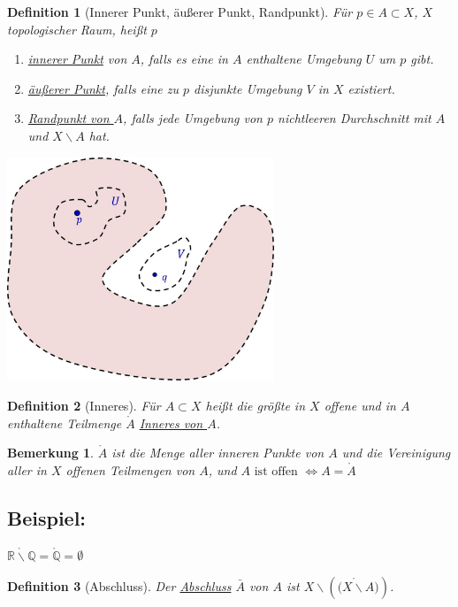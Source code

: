 \documentclass[a4paper,11pt,notitlepage]{report}
\newtheorem{definition}{Definition}[chapter]
\newtheorem{remark}{Bemerkung}[chapter]
\newcommand{\R}{{\ensuremath{\mathbb{R}}}}
\newcommand{\Q}{{\ensuremath{\mathbb{Q}}}}
\newenvironment{bsp}[1]
{
\setlength{\fboxsep}{10pt}
\subsection*{Beispiel: #1}
\begin{upshape}
}
{
\end{upshape}
}
\begin{document}
\begin{definition}[Innerer Punkt, äußerer Punkt, Randpunkt]
	Für $p \in A \subset X$, $X$ topologischer Raum, heißt $p$
	\newline
	\begin{enumerate}[(1)]
		\item \underline{innerer Punkt} von $A$, falls es eine in $A$ enthaltene Umgebung $U$ um $p$ gibt. 
		\item \underline{äußerer Punkt}, falls eine zu $p$ disjunkte Umgebung $V$ in $X$ existiert.
		\item \underline{Randpunkt von $A$}, falls jede Umgebung von $p$ nichtleeren Durchschnitt mit $A$ und $X \backslash A$ hat.
	\end{enumerate}
\end{definition}
	\begin{center}
	\includegraphics[width=0.6\textwidth]{images/innen_aussen.jpg}
	\end{center}
	
\begin{definition}[Inneres]
	Für $A \subset X$ heißt die größte in $X$ offene und in $A$ enthaltene Teilmenge $\mathring A$ \underline{Inneres von $A$}.
\end{definition}

\begin{remark}
	$\mathring A$ ist die Menge aller inneren Punkte von $A$ und die Vereinigung aller in $X$ offenen Teilmengen von $A$, und $A \text{ ist offen } \Leftrightarrow A = \mathring A$
\end{remark}

\begin{bsp}{}
	$\mathring {\R \backslash \Q} = \mathring \Q = \emptyset$
\end{bsp}

\begin{definition}[Abschluss]
	Der \underline{Abschluss} $\bar{A}$ von $A$ ist $X \backslash \left ( \mathring {(X \backslash A} ) \right )$.
\end{definition}
\end{document}
